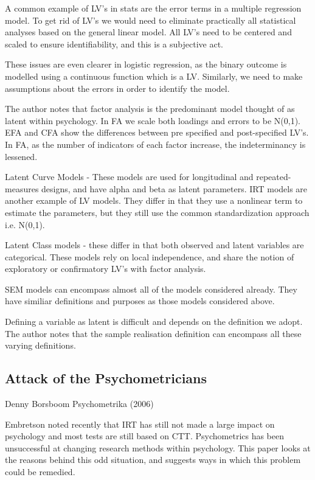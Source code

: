 A common example of LV's in stats are the error terms in a multiple regression model.
To get rid of LV's we would need to eliminate practically all statistical analyses based on the general linear model.
All LV's need to be centered and scaled to ensure identifiability, and this is a subjective act.

These issues are even clearer in logistic regression, as the binary outcome is modelled using a continuous function which is a LV.
Similarly, we need to make assumptions about the errors in order to identify the model.

The author notes that factor analysis is the predominant model thought of as latent within psychology.
In FA we scale both loadings and errors to be N(0,1). EFA and CFA show the differences between pre specified and post-specified LV's.
In FA, as the number of indicators of each factor increase, the indeterminancy is lessened. 

Latent Curve Models - These models are used for longitudinal and repeated-measures designs, and have alpha and beta as latent parameters.
IRT models are another example of LV models. They differ in that they use a nonlinear term to estimate the parameters, but they still use the common standardization approach i.e. N(0,1). 

Latent Class models - these differ in that both observed and latent variables are categorical.
These models rely on local independence, and share the notion of exploratory or confirmatory LV's with factor analysis.

SEM models can encompass almost all of the models considered already. 
They have similiar definitions and purposes as those models considered above.

Defining a variable as latent is difficult and depends on the definition we adopt.
The author notes that the sample realisation definition can encompass all these varying definitions. 

\subsection{Attack of the Psychometricians}
Denny Borsboom
Psychometrika (2006)

Embretson noted recently that IRT has still not made a large impact on psychology and most tests are still based on CTT.
Psychometrics has been unsuccessful at changing research methods within psychology.
This paper looks at the reasons behind this odd situation, and suggests ways in which this problem could be remedied.

